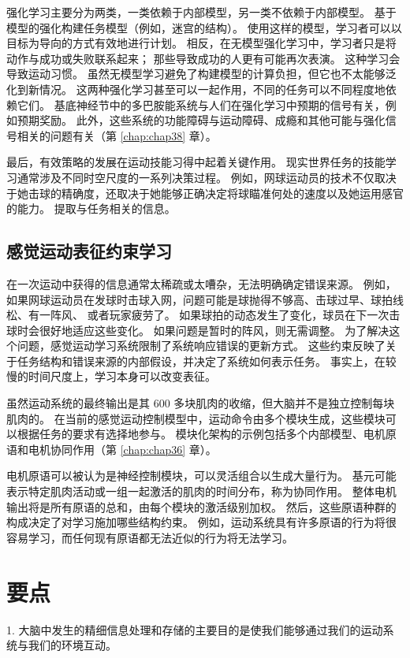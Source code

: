 强化学习主要分为两类，一类依赖于内部模型，另一类不依赖于内部模型。 基于模型的强化构建任务模型（例如，迷宫的结构）。 使用这样的模型，学习者可以以目标为导向的方式有效地进行计划。 相反，在无模型强化学习中，学习者只是将动作与成功或失败联系起来； 那些导致成功的人更有可能再次表演。 这种学习会导致运动习惯。 虽然无模型学习避免了构建模型的计算负担，但它也不太能够泛化到新情况。 这两种强化学习甚至可以一起作用，不同的任务可以不同程度地依赖它们。 基底神经节中的多巴胺能系统与人们在强化学习中预期的信号有关，例如预期奖励。 此外，这些系统的功能障碍与运动障碍、成瘾和其他可能与强化信号相关的问题有关（第 \ref{chap:chap38} 章）。

最后，有效策略的发展在运动技能习得中起着关键作用。 现实世界任务的技能学习通常涉及不同时空尺度的一系列决策过程。 例如，网球运动员的技术不仅取决于她击球的精确度，还取决于她能够正确决定将球瞄准何处的速度以及她运用感官的能力。 提取与任务相关的信息。

\subsection{感觉运动表征约束学习}
在一次运动中获得的信息通常太稀疏或太嘈杂，无法明确确定错误来源。 例如，如果网球运动员在发球时击球入网，问题可能是球抛得不够高、击球过早、球拍线松、有一阵风、 或者玩家疲劳了。 如果球拍的动态发生了变化，球员在下一次击球时会很好地适应这些变化。 如果问题是暂时的阵风，则无需调整。 为了解决这个问题，感觉运动学习系统限制了系统响应错误的更新方式。 这些约束反映了关于任务结构和错误来源的内部假设，并决定了系统如何表示任务。 事实上，在较慢的时间尺度上，学习本身可以改变表征。

虽然运动系统的最终输出是其 600 多块肌肉的收缩，但大脑并不是独立控制每块肌肉的。 在当前的感觉运动控制模型中，运动命令由多个模块生成，这些模块可以根据任务的要求有选择地参与。 模块化架构的示例包括多个内部模型、电机原语和电机协同作用（第 \ref{chap:chap36} 章）。

电机原语可以被认为是神经控制模块，可以灵活组合以生成大量行为。 基元可能表示特定肌肉活动或一组一起激活的肌肉的时间分布，称为协同作用。 整体电机输出将是所有原语的总和，由每个模块的激活级别加权。 然后，这些原语种群的构成决定了对学习施加哪些结构约束。 例如，运动系统具有许多原语的行为将很容易学习，而任何现有原语都无法近似的行为将无法学习。


\section{要点}

1. 大脑中发生的精细信息处理和存储的主要目的是使我们能够通过我们的运动系统与我们的环境互动。


